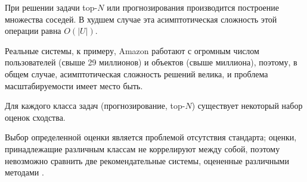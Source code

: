При решении задачи top-$N$ или прогнозирования производится построение множества соседей. В худшем случае эта асимптотическая 
сложность этой операции равна $O(|U|)$\cite{amazon-item2item}.

Реальные системы, к примеру, Amazon работают с огромным числом пользователей (свыше 29 миллионов) и объектов (свыше миллиона)\cite{amazon-size,netflix-size}, 
поэтому, в общем случае, асимптотическая сложность решений велика, и проблема масштабируемости имеет место быть\cite{scalable1,scalable2,scalable3,scalable4}.

Для каждого класса задач (прогнозирование, top-$N$) существует некоторый набор оценок сходства.

\begin{assert}
	\label{no-standard-eval}
	Выбор определенной оценки является проблемой отсутствия стандарта; оценки,
принадлежащие
различным классам не коррелируют между собой, поэтому невозможно сравнить две
рекомендательные
системы, оцененные различными методами \cite{herloker-eval}.
\end{assert}
